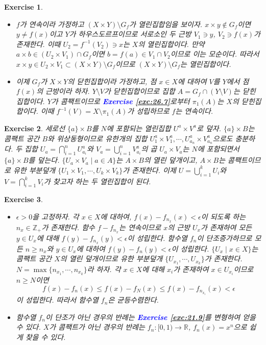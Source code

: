 \documentclass{article}
\newtheorem{exercise}{Exercise}[section]
\newcommand{\R}{\mathbb{R}}
\newcommand{\Z}{\mathbb{Z}}
\begin{document}
\begin{exercise}
	\label{exc:26.8}
    \phantom{}
    \begin{itemize}
        \item[($\Longrightarrow$)] $f$가 연속이라 가정하고 $(X\times Y)\setminus G_f$가 열린집합임을 보이자. $x\times y\notin G_f$이면 $y\ne f(x)$이고 $Y$가 하우스도르프이므로 서로소인 두 근방 $V_1\ni y$, $V_2\ni f(x)$가 존재한다. 이때 $U_2=f^{-1}(V_2)\ni x$는 $X$의 열린집합이다. 만약 $a\times b\in(U_2\times V_1)\cap G_f$이면 $b=f(a)\in V_1\cap V_2$이므로 이는 모순이다. 따라서 $x\times y\in U_2\times V_1\subset(X\times Y)\setminus G_f$이므로 $(X\times Y)\setminus G_f$는 열린집합이다.
        \item[($\Longleftarrow$)] 이제 $G_f$가 $X\times Y$의 닫힌집합이라 가정하고, 점 $x\in X$에 대하여 $V$를 $Y$에서 점 $f(x)$의 근방이라 하자. $Y\setminus V$가 닫힌집합이므로 집합 $A=G_f\cap(Y\setminus V)$는 닫힌집합이다. $Y$가 콤팩트이므로 \textcolor{blue}{\textbf{Exercise \ref{exc:26.7}}}로부터 $\pi_1(A)$는 $X$의 닫힌집합이다. 이때 $f^{-1}(V)=X\setminus\pi_1(A)$가 성립하므로 $f$는 연속이다.
    \end{itemize}
\end{exercise}

\begin{exercise}
    세로선 $\{a\}\times B$를 $N$에 포함되는 열린집합 $U^a\times V^a$로 덮자. $\{a\}\times B$는 콤팩트 공간 $B$와 위상동형이므로 유한개의 집합 $U_1^a\times V_1^a,\cdots,U_{a_n}^a\times V_{a_n}^a$으로도 충분하다. 두 집합 $U_a=\bigcap_{i=1}^nU_{a_i}^a$와 $V_a=\bigcup_{i=1}^nV_{a_i}^a$의 곱 $U_a\times V_a$는 $N$에 포함되면서 $\{a\}\times B$를 덮는다. $\{U_a\times V_a\mid a\in A\}$는 $A\times B$의 열린 덮개이고, $A\times B$는 콤팩트이므로 유한 부분덮개 $\{U_1\times V_1,\cdots,U_k\times V_k\}$가 존재한다. 이제 $U=\bigcup_{i=1}^kU_i$와 $V=\bigcap_{i=1}^kV_i$가 찾고자 하는 두 열린집합이 된다.
\end{exercise}

\begin{exercise}
    \phantom{}
    \begin{itemize}
        \item[(a)] $\epsilon>0$을 고정하자. 각 $x\in X$에 대하여, $f(x)-f_{n_x}(x)<\epsilon$이 되도록 하는 $n_x\in\Z_+$가 존재한다. 함수 $f-f_{n_x}$는 연속이므로 $x$의 근방 $U_x$가 존재하여 모든 $y\in U_x$에 대해 $f(y)-f_{n_x}(y)<\epsilon$이 성립한다. 함수열 $f_n$이 단조증가하므로 모든 $n\geq n_x$와 $y\in U_x$에 대하여 $f(y)-f_n(y)<\epsilon$이 성립한다. $\{U_x\mid x\in X\}$는 콤팩트 공간 $X$의 열린 덮개이므로 유한 부분덮개 $\{U_{x_1},\cdots,U_{x_k}\}$가 존재한다. $N=\max\{n_{x_1},\cdots,n_{x_k}\}$라 하자. 각 $x\in X$에 대해 $x_i$가 존재하여 $x\in U_{x_i}$이므로 $n\geq N$이면
            \[
                f(x)-f_n(x)\leq f(x)-f_N(x)\leq f(x)-f_{n_{x_i}}(x)<\epsilon
            \]
            이 성립한다. 따라서 함수열 $f_n$은 균등수렴한다.
        \item[(b)] 함수열 $f_n$이 단조가 아닌 경우의 반례는 \textcolor{blue}{\textbf{Exercise \ref{exc:21.9}}}를 변형하여 얻을 수 있다. $X$가 콤팩트가 아닌 경우의 반례는 $f_n:[0,1)\to \R$, $f_n(x)=x^n$으로 쉽게 찾을 수 있다.
    \end{itemize}
\end{exercise}
\end{document}

